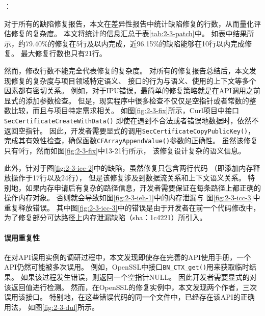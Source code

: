 {}：

对于所有的缺陷修复报告，本文在差异性报告中统计缺陷修复的行数，从而量化评估修复的复杂度。
本文将统计的信息汇总于表\ref{tab:2-3-patch}中。
如表中结果所示，约79.40\%的修复在5行及以内完成，近96.15\%的缺陷能够在10行以内完成修复。
最大修复行数也只有21行。



然而，修改行数不能完全代表修复的复杂度。
对所有的修复报告总结后，本文发现修复的复杂度与项目领域特定语义、
接口的行为与语义、使用的上下文等多个因素都有密切关系。
例如，对于IPU错误，最简单的修复策略就是在API调用之前显式的添加参数检查。
但是，现实程序中很多检查不仅仅是空指针或者常数的整数比较，而且与项目特定需求相关。
如图\ref{fig:2-3-fix}所示，Curl项目中接口\texttt{SecCertificateCreateWithData()}
即使在遇到不合法或者错误地数据时，依然不返回空指针。
因此，开发者需要显式的调用\texttt{SecCertificateCopyPublicKey()}，
完成其有效性检查，确保函数\texttt{CFArrayAppendValue()}参数的正确性。
虽然该修复只有9行，然而如图\ref{fig:2-3-fix}中13-21行所示，
该修复设计复杂的语义信息。


此外，针对于图\ref{fig:2-3-icc-2}中的缺陷，虽然修复只包含两行代码
（即添加内存释放操作于17行以及24行），
但是该修复涉及到数据流关系和上下文语义关系。
特别地，如果内存申请后有复杂的路径信息，开发者需要保证在每条路径上都正确的操作内存对象。
否则就会导致如图\ref{fig:2-3-ieh-1}中的内存泄漏与
图\ref{fig:2-3-icc-3}中重复释放错误。
其中图\ref{fig:2-3-icc-3}中的错误是由于开发者在前一个代码修改中，
为了修复部分可达路径上内存泄漏缺陷（sha：1c4221）所引入。

\vspace*{10pt}
\begin{center}
	\noindent{}
\end{center}



\paragraph{误用重复性}
在对API误用实例的调研过程中，本文发现即使存在完善的API使用手册，一个API仍然可能被多次误用。
例如，OpenSSL中接口\texttt{BN\_CTX\_get()}用来获取临时结果。
如果该过程发生错误，则返回一个空指针NULL。
因此开发者需要显式的对该返回值进行检测。
然而，在OpenSSL的修复实例中，本文发现两个作者，三次误用该接口。
特别地，在这些错误代码的同一个文件中，已经存在该API的正确用法，
如图\ref{fig:2-3-dul}所示。

